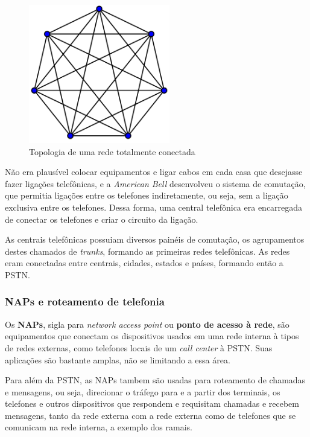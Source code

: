 \documentclass[12pt]{article}
\begin{document}
\vspace*{1em}
\begin{figure}[ht]
    \centering
    \includegraphics[width=0.55\textwidth]{network.png}
    \caption{Topologia de uma rede totalmente conectada}
    \label{fig:network}
\end{figure}
\vspace*{1em}

Não era plausível colocar equipamentos e ligar cabos em cada casa que desejasse
fazer ligações telefônicas, e a \textit{American Bell} desenvolveu o sistema de
comutação, que permitia ligações entre os telefones indiretamente, ou seja, sem
a ligação exclusiva entre os telefones. Dessa forma, uma central telefônica era
encarregada de conectar os telefones e criar o circuito da ligação.

As centrais telefônicas possuiam diversos painéis de comutação, os agrupamentos
destes chamados de \textit{trunks}, formando as primeiras redes telefônicas. As
redes eram conectadas entre centrais, cidades, estados e países, formando então
a PSTN.

\subsubsection{NAPs e roteamento de telefonia}

Os \textbf{NAPs}, sigla para \textit{network access point} ou
\textbf{ponto de acesso à rede}, são equipamentos que conectam os dispositivos
usados em uma rede interna à tipos de redes externas, como telefones locais de
um \textit{call center} à PSTN. Suas aplicações são bastante amplas, não se
limitando a essa área.

Para além da PSTN, as NAPs tambem são usadas para roteamento de chamadas e
mensagens, ou seja, direcionar o tráfego para e a partir dos terminais, os
telefones e outros dispositivos que respondem e requisitam chamadas e recebem
mensagens, tanto da rede externa com a rede externa como de telefones que se
comunicam na rede interna, a exemplo dos ramais.
\end{document}

